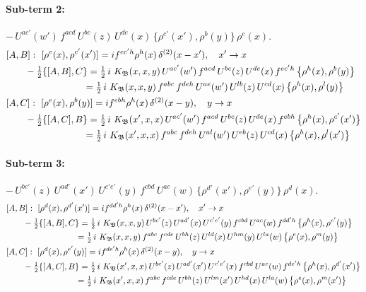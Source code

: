 \documentclass[10pt]{article}
\numberwithin{equation}{section}
\begin{document}
\paragraph{Sub-term 2:} $-\,U^{ac'}(w')\,f^{acd}\,U^{bc}(z)\,U^{de}(x)\,\big\{\rho^{c'}(x'),\rho^{b}(y)\big\}\,\rho^{e}(x)$.
\begin{align}
&[A,B]:\ [\rho^{e}(x),\rho^{c'}(x')]=i f^{ec'h}\rho^{h}(x)\,\delta^{(2)}(x-x'),\quad x'\to x\notag\\
&\qquad -\tfrac12\{[A,B],C\}=\tfrac12\,i\,\,K_{\mathfrak B}(x,x,y)\,U^{ac'}(w')\,f^{acd}\,U^{bc}(z)\,U^{de}(x)\,f^{ec'h}\,\big\{\rho^{h}(x),\rho^{b}(y)\big\}\notag\\
&\qquad\phantom{-\tfrac12\{[A,B],C\}}=\tfrac12\,i\,\,K_{\mathfrak B}(x,x,y)\,f^{abc}\,f^{deh}\,U^{ae}(w')\,U^{lb}(z)\,U^{cd}(x)\,\big\{\rho^{h}(x),\rho^{l}(y)\big\}
\label{R:eq:GII.I1-2-AB}\\
&[A,C]:\ [\rho^{e}(x),\rho^{b}(y)]=i f^{ebh}\rho^{h}(x)\,\delta^{(2)}(x-y),\quad y\to x\notag\\
&\qquad -\tfrac12\{[A,C],B\}=\tfrac12\,i\,\,K_{\mathfrak B}(x',x,x)\,U^{ac'}(w')\,f^{acd}\,U^{bc}(z)\,U^{de}(x)\,f^{ebh}\,\big\{\rho^{h}(x),\rho^{c'}(x')\big\}\notag\\
&\qquad\phantom{-\tfrac12\{[A,C],B\}}=\tfrac12\,i\,\,K_{\mathfrak B}(x',x,x)\,f^{abc}\,f^{deh}\,U^{al}(w')\,U^{eb}(z)\,U^{cd}(x)\,\big\{\rho^{h}(x),\rho^{l}(x')\big\}
\label{R:eq:GII.I1-2-AC}
\end{align}
\paragraph{Sub-term 3:} $-\,U^{bc'}(z)\,U^{ad'}(x')\,U^{c'e'}(y)\,f^{cbd}\,U^{ac}(w)\,\big\{\rho^{d'}(x'),\rho^{e'}(y)\big\}\,\rho^{d}(x)$.
\begin{align}
&[A,B]:\ [\rho^{d}(x),\rho^{d'}(x')]=i f^{dd'h}\rho^{h}(x)\,\delta^{(2)}(x-x'),\quad x'\to x\notag\\
&\qquad -\tfrac12\{[A,B],C\}=\tfrac12\,i\,\,K_{\mathfrak B}(x,x,y)\,U^{bc'}(z)\,U^{ad'}(x)\,U^{c'e'}(y)\,f^{cbd}\,U^{ac}(w)\,f^{dd'h}\,\big\{\rho^{h}(x),\rho^{e'}(y)\big\}\notag\\
&\qquad\phantom{-\tfrac12\{[A,B],C\}}=\tfrac12\,i\,\,K_{\mathfrak B}(x,x,y)\,f^{abc}\,f^{cde}\,U^{bh}(z)\,U^{ld}(x)\,U^{hm}(y)\,U^{la}(w)\,\big\{\rho^{e}(x),\rho^{m}(y)\big\}
\label{R:eq:GII.I1-3-AB}\\
&[A,C]:\ [\rho^{d}(x),\rho^{e'}(y)]=i f^{de'h}\rho^{h}(x)\,\delta^{(2)}(x-y),\quad y\to x\notag\\
&\qquad -\tfrac12\{[A,C],B\}=\tfrac12\,i\,\,K_{\mathfrak B}(x',x,x)\,U^{bc'}(z)\,U^{ad'}(x')\,U^{c'e'}(x)\,f^{cbd}\,U^{ac}(w)\,f^{de'h}\,\big\{\rho^{h}(x),\rho^{d'}(x')\big\}\notag\\
&\qquad\phantom{-\tfrac12\{[A,C],B\}}=\tfrac12\,i\,\,K_{\mathfrak B}(x',x,x)\,f^{abc}\,f^{cde}\,U^{bh}(z)\,U^{lm}(x')\,U^{hd}(x)\,U^{la}(w)\,\big\{\rho^{e}(x),\rho^{m}(x')\big\}
\label{R:eq:GII.I1-3-AC}
\end{align}
\end{document}
